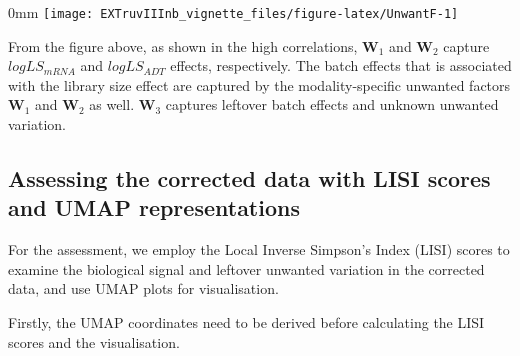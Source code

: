 \documentclass[]{article}
\begin{document}
\begin{adjustwidth}{\fltoffset}{0mm}
\texttt{[image: EXTruvIIInb\_vignette\_files/figure-latex/UnwantF-1]} \end{adjustwidth}

From the figure above, as shown in the high correlations, \(\boldsymbol W_1\) and \(\boldsymbol W_2\) capture \(logLS_{mRNA}\) and \(logLS_{ADT}\) effects, respectively. The batch effects that is associated with the library size effect are captured by the modality-specific unwanted factors \(\boldsymbol W_1\) and \(\boldsymbol W_2\) as well. \(\boldsymbol W_3\) captures leftover batch effects and unknown unwanted variation.

\subsection{Assessing the corrected data with LISI scores and UMAP representations}\label{assessing-the-corrected-data-with-lisi-scores-and-umap-representations}

For the assessment, we employ the Local Inverse Simpson's Index (LISI) scores to examine the biological signal and leftover unwanted variation in the corrected data, and use UMAP plots for visualisation.

Firstly, the UMAP coordinates need to be derived before calculating the LISI scores and the visualisation.
\end{document}
